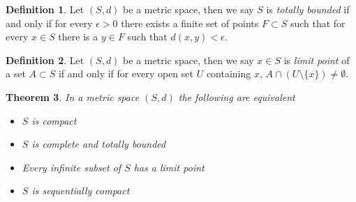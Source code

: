 \documentclass{amsart}
\newtheorem{thm}{Theorem}[section]
\theoremstyle{remark}
\theoremstyle{definition}
\newtheorem{defn}[thm]{Definition}
\begin{document}
\begin{defn}Let $(S,d)$ be a metric space, then we say $S$
  is \emph{totally bounded} if and only if for every $\epsilon >0$
  there exists a finite set of points $F \subset S$ such that for
  every $x\in S$ there is a $y \in F$ such that $d(x,y) < \epsilon$.
\end{defn}

\begin{defn}Let $(S,d)$ be a metric space, then we say $x \in S$
  is \emph{limit point} of a set $A \subset S$ if and only if for
  every open set $U$ containing $x$, $A \cap (U \setminus \lbrace x
  \rbrace) \neq \emptyset$.
\end{defn}

\begin{thm}\label{CompactnessInMetricSpaces}In a metric space $(S,d)$ the following are equivalent
\begin{itemize}
\item[(i)]$S$ is compact
\item[(ii)]$S$ is complete and totally bounded
\item[(iii)]Every infinite subset of $S$ has a limit point
\item[(iv)]$S$ is sequentially compact
\end{itemize}
\end{thm}
\end{document}
